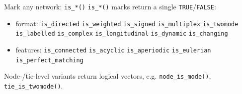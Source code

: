 \documentclass[9pt]{extarticle}
\let\code\verb
\begin{document}
\begin{minipage}[t]{0.323\textwidth}
\begin{mnbox}{Mark any network: \texttt{is\_*()}}
\code|is_*()| marks return a single \code|TRUE|/\code|FALSE|:
\begin{itemize}
\item format: \code|is_directed| \code|is_weighted| \code|is_signed| \code|is_multiplex|
\code|is_twomode| \code|is_labelled| \code|is_complex| \code|is_longitudinal| \code|is_dynamic| \code|is_changing|
\item features: \code|is_connected| \code|is_acyclic| \code|is_aperiodic|
\code|is_eulerian| \code|is_perfect_matching|
\end{itemize}
Node-/tie-level variants return logical vectors, e.g. \code|node_is_mode()|,
\code|tie_is_twomode()|.
\end{mnbox}

\end{minipage}\hfill
%
\end{document}

